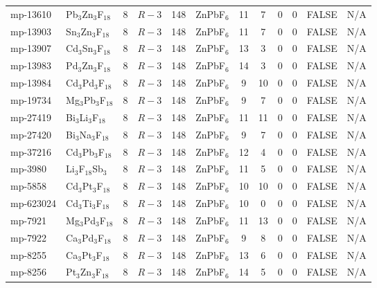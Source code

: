 {\begin{longtable}{llcccccccccc}
    mp-13610 & Pb$_{3}$Zn$_{3}$F$_{18}$ & 8     & $R-3$ & 148   & ZnPbF$_{6}$ & 11    & 7     & 0     & 0     & FALSE & N/A \\
    mp-13903 & Sn$_{3}$Zn$_{3}$F$_{18}$ & 8     & $R-3$ & 148   & ZnPbF$_{6}$ & 11    & 7     & 0     & 0     & FALSE & N/A \\
    mp-13907 & Cd$_{3}$Sn$_{3}$F$_{18}$ & 8     & $R-3$ & 148   & ZnPbF$_{6}$ & 13    & 3     & 0     & 0     & FALSE & N/A \\
    mp-13983 & Pd$_{3}$Zn$_{3}$F$_{18}$ & 8     & $R-3$ & 148   & ZnPbF$_{6}$ & 14    & 3     & 0     & 0     & FALSE & N/A \\
    mp-13984 & Cd$_{3}$Pd$_{3}$F$_{18}$ & 8     & $R-3$ & 148   & ZnPbF$_{6}$ & 9     & 10    & 0     & 0     & FALSE & N/A \\
    mp-19734 & Mg$_{3}$Pb$_{3}$F$_{18}$ & 8     & $R-3$ & 148   & ZnPbF$_{6}$ & 9     & 7     & 0     & 0     & FALSE & N/A \\
    mp-27419 & Bi$_{3}$Li$_{3}$F$_{18}$ & 8     & $R-3$ & 148   & ZnPbF$_{6}$ & 11    & 11    & 0     & 0     & FALSE & N/A \\
    mp-27420 & Bi$_{3}$Na$_{3}$F$_{18}$ & 8     & $R-3$ & 148   & ZnPbF$_{6}$ & 9     & 7     & 0     & 0     & FALSE & N/A \\
    mp-37216 & Cd$_{3}$Pb$_{3}$F$_{18}$ & 8     & $R-3$ & 148   & ZnPbF$_{6}$ & 12    & 4     & 0     & 0     & FALSE & N/A \\
    mp-3980 & Li$_{3}$F$_{18}$Sb$_{3}$ & 8     & $R-3$ & 148   & ZnPbF$_{6}$ & 11    & 5     & 0     & 0     & FALSE & N/A \\
    mp-5858 & Cd$_{3}$Pt$_{3}$F$_{18}$ & 8     & $R-3$ & 148   & ZnPbF$_{6}$ & 10    & 10    & 0     & 0     & FALSE & N/A \\
    mp-623024 & Cd$_{3}$Ti$_{3}$F$_{18}$ & 8     & $R-3$ & 148   & ZnPbF$_{6}$ & 10    & 0     & 0     & 0     & FALSE & N/A \\
    mp-7921 & Mg$_{3}$Pd$_{3}$F$_{18}$ & 8     & $R-3$ & 148   & ZnPbF$_{6}$ & 11    & 13    & 0     & 0     & FALSE & N/A \\
    mp-7922 & Ca$_{3}$Pd$_{3}$F$_{18}$ & 8     & $R-3$ & 148   & ZnPbF$_{6}$ & 9     & 8     & 0     & 0     & FALSE & N/A \\
    mp-8255 & Ca$_{3}$Pt$_{3}$F$_{18}$ & 8     & $R-3$ & 148   & ZnPbF$_{6}$ & 13    & 6     & 0     & 0     & FALSE & N/A \\
    mp-8256 & Pt$_{3}$Zn$_{3}$F$_{18}$ & 8     & $R-3$ & 148   & ZnPbF$_{6}$ & 14    & 5     & 0     & 0     & FALSE & N/A \\

\end{longtable}}
